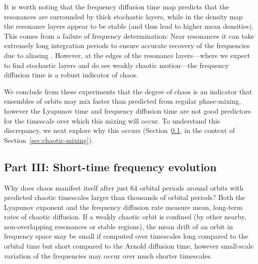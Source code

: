 \documentclass[letterpaper,12pt,preprint]{aastex}
\begin{document}
It is worth noting that the frequency diffusion time map predicts that the resonances are surrounded by thick stochastic layers, while in the density map the resonance layers appear to be stable (and thus lead to higher mean densities). This comes from a failure of frequency determination: Near resonances it can take extremely long integration periods to ensure accurate recovery of the frequencies due to aliasing \citep{laskar03}. However, at the edges of the resonance layers---where we expect to find stochastic layers and do see weakly chaotic motion---the frequency diffusion time is a robust indicator of chaos.

We conclude from these experiments that the degree of chaos is an indicator that ensembles of orbits may mix faster than predicted from regular phase-mixing, however the Lyapunov time and frequency diffusion time are not good predictors for the timescale over which this mixing will occur. To understand this discrepancy, we next explore why this occurs (Section~\ref{sec:results3}, in the context of Section~\ref{sec:chaotic-mixing}).

\subsection{Part III: Short-time frequency evolution}\label{sec:results3}

Why does chaos manifest itself after just 64 orbital periods around orbits with predicted chaotic timescales larger than thousands of orbital periods? Both the Lyapunov exponent and the frequency diffusion rate measure mean, long-term rates of chaotic diffusion. If a weakly chaotic orbit is confined (by other nearby, non-overlapping resonances or stable regions), the mean drift of an orbit in frequency space may be small if computed over timescales long compared to the orbital time but short compared to the Arnold diffusion time, however small-scale variation of the frequencies may occur over much shorter timescales. 
\end{document}
